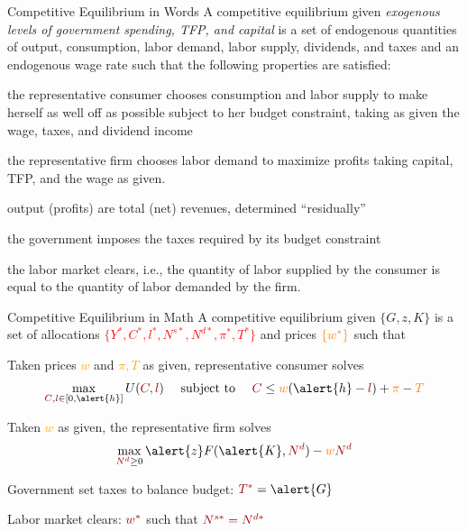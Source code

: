 \documentclass[11pt,aspectratio=169,usenames,dvipsnames]{beamer}
\newcommand{\orange}[1]{\textcolor{orange}{#1}}
\newcommand{\red}[1]{\textcolor{red}{#1}}
\let\tempa\enumerate
\let\tempb\endenumerate
\renewenvironment{enumerate}{\tempa\addtolength{\itemsep}{\fill}}{\tempb}
\begin{document}
\begin{frame}{Competitive Equilibrium in Words}
\label{slide:Competitive_Equilibrium_in_Words}
    A competitive equilibrium given \textit{exogenous levels of government spending, TFP, and capital} is a set of \alert{endogenous quantities of output, consumption, labor demand, labor supply, dividends, and taxes and an endogenous wage rate} such that the following properties are satisfied:
    \begin{enumerate}
        \item the representative consumer chooses \alert{consumption and labor supply} to make herself as well off as possible subject to her budget constraint, taking as \alert{given the wage, taxes, and dividend income}
        \item the representative firm chooses \alert{labor demand} to maximize profits taking \alert{capital, TFP, and the wage as given}.
        \item output (profits) are total (net) revenues, determined ``residually''
        \item the government imposes the \alert{taxes} required by its budget constraint
        \item the \alert{labor market clears}, i.e., the quantity of labor supplied by the consumer is equal to the quantity of labor demanded by the firm.
    \end{enumerate}
\end{frame}

\begin{frame}{Competitive Equilibrium in Math}
\label{slide:Competitive_Equilibrium_in_Math}
    A \alert{competitive equilibrium} given \alert{$ \{ G, z, K \} $} is a set of allocations \red{$ \{ Y^{*}, C^{*}, l^{*}, N^{s*}, N^{d*}, \pi^{*}, T^{*} \}$} and prices $ \orange{\{ w^{*} \}} $ such that
    \begin{enumerate}
        \item Taken prices \orange{$w$} and \orange{$\pi, T$} as given, representative consumer solves
        \begin{equation}
        \label{eq:consumer_problem}
            \max_{\red{C}, \red{l} \in [ 0, \alert{h} ]} U( \red{C, l} ) \quad \text{ subject to } \quad \red{C} \le \orange{w} ( \alert{h} - \red{l} ) + \orange{\pi} - \orange{T}
        \end{equation}
        \item Taken \orange{$w$} as given, the representative firm solves
        \begin{equation}
        \label{eq:firm_problem}
            \max_{\red{N^{d}} \ge 0} \alert{z} F( \alert{K}, \red{N^{d}} ) - \orange{w} \red{N^{d}}
        \end{equation}
        \item Government set taxes to balance budget: $ \red{T^{*}} = \alert{G} $
        \item Labor market clears: $ \red{w^{*}} $ such that $ \red{N^{s*} = N^{d*}} $
    \end{enumerate}
\end{frame}
\end{document}
